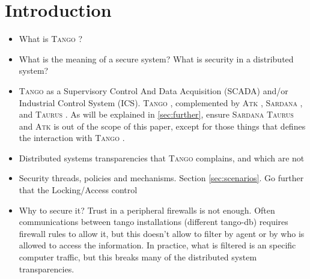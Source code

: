 \documentclass[10pt,a4paper,twoside]{llncs}
\newcommand{\tango}{\textsc{Tango} }
\newcommand{\sardana}{\textsc{Sardana} }
\newcommand{\taurus}{\textsc{Taurus} }
\newcommand{\atk}{\textsc{Atk} }
\begin{document}
%
\section{Introduction \label{sec:intro}}

\begin{itemize}
 \item What is \tango?
 \item What is the meaning of a secure system? What is security in a distributed system?
 \item \tango as a Supervisory Control And Data Acquisition (SCADA) and/or Industrial Control System (ICS). \tango, complemented by \atk, \sardana, and \taurus. As will be explained in \ref{sec:further}, ensure \sardana \taurus and \atk is out of the scope of this paper, except for those things that defines the interaction with \tango.
  \item Distributed systems transparencies \cite{TanenbaumDistr} that \tango complains, and which are not
  
 \item Security threads, policies and mechanisms. Section \ref{sec:scenarios}. Go further that the Locking/Access control
  \item Why to secure it? Trust in a peripheral firewalls is not enough. Often communications between tango installations (different tango-db) requires firewall rules to allow it, but this doesn't allow to filter by agent or by who is allowed to access the information. In practice, what is filtered is an specific computer traffic, but this breaks many of the distributed system transparencies.
 

\end{itemize}
\end{document}
